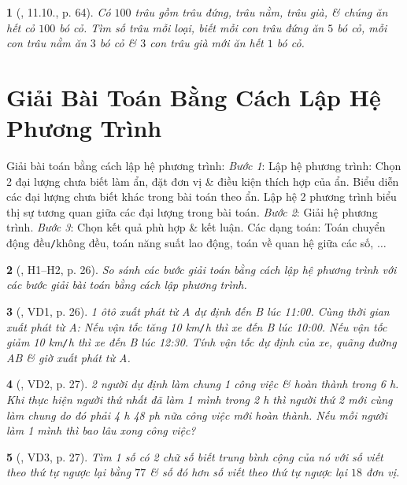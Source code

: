 \documentclass{article}
\newtheorem{baitoan}{}
\begin{document}
\begin{baitoan}[\cite{TLCT_THCS_Toan_9_dai_so}, 11.10., p. 64]
	Có $100$ trâu gồm trâu đứng, trâu nằm, trâu già, \& chúng ăn hết cỏ $100$ bó cỏ. Tìm số trâu mỗi loại, biết mỗi con trâu đứng ăn $5$ bó cỏ, mỗi con trâu nằm ăn $3$ bó cỏ \& $3$ con trâu già mới ăn hết $1$ bó cỏ.
\end{baitoan}


\section{Giải Bài Toán Bằng Cách Lập Hệ Phương Trình}
 {\sf Giải bài toán bằng cách lập hệ phương trình:} \textit{Bước 1}: Lập hệ phương trình: Chọn 2 đại lượng chưa biết làm ẩn, đặt đơn vị \& điều kiện thích hợp của ẩn. Biểu diễn các đại lượng chưa biết khác trong bài toán theo ẩn. Lập hệ 2 phương trình biểu thị sự tương quan giữa các đại lượng trong bài toán. \textit{Bước 2}: Giải hệ phương trình. \textit{Bước 3}: Chọn kết quả phù hợp \& kết luận.  Các dạng toán: Toán chuyển động đều{\tt/}không đều, toán năng suất lao động, toán về quan hệ giữa các số, $\ldots$

\begin{baitoan}[\cite{Binh_boi_duong_Toan_9_tap_2}, H1--H2, p. 26]
	So sánh các bước giải toán bằng cách lập hệ phương trình với các bước giải bài toán bằng cách lập phương trình.
\end{baitoan}

\begin{baitoan}[\cite{Binh_boi_duong_Toan_9_tap_2}, VD1, p. 26]
	1 ôtô xuất phát từ A dự định đến B lúc {\rm11:00}. Cùng thời gian xuất phát từ A: Nếu vận tốc tăng {\rm10 km{\tt/}h} thì xe đến B lúc {\rm10:00}. Nếu vận tốc giảm {\rm10 km{\tt/}h} thì xe đến B lúc {\rm12:30}. Tính vận tốc dự định của xe, quãng đường AB \& giờ xuất phát từ A.
\end{baitoan}

\begin{baitoan}[\cite{Binh_boi_duong_Toan_9_tap_2}, VD2, p. 27]
	2 người dự định làm chung 1 công việc \& hoàn thành trong {\rm6 h}. Khi thực hiện người thứ nhất đã làm 1 mình trong {\rm2 h} thì người thứ 2 mới cùng làm chung do đó phải {\rm4 h 48 ph} nữa công việc mới hoàn thành. Nếu mỗi người làm 1 mình thì bao lâu xong công việc?
\end{baitoan}

\begin{baitoan}[\cite{Binh_boi_duong_Toan_9_tap_2}, VD3, p. 27]
	Tìm 1 số có 2 chữ số biết trung bình cộng của nó với số viết theo thứ tự ngược lại bằng $77$ \& số đó hơn số viết theo thứ tự ngược lại $18$ đơn vị.
\end{baitoan}
\end{document}
